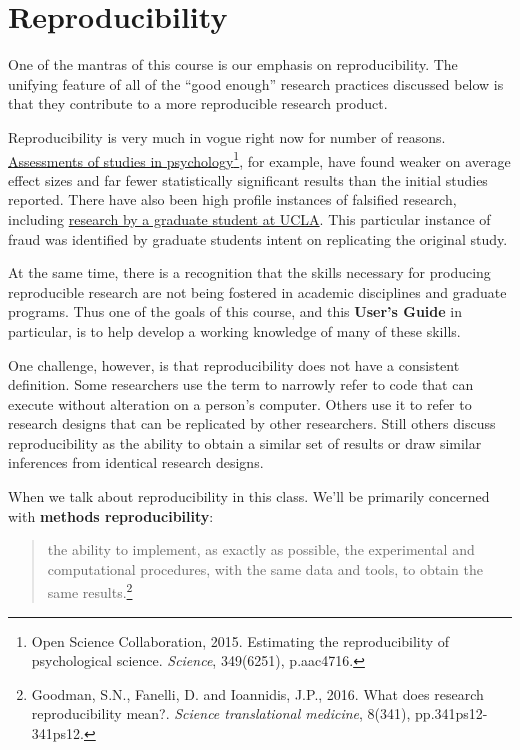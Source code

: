 \documentclass[]{book}
\let\rmarkdownfootnote\footnote%
\def\footnote{\protect\rmarkdownfootnote}
\begin{document}
\section{Reproducibility}\label{reproducibility}

One of the mantras of this course is our emphasis on reproducibility.
The unifying feature of all of the ``good enough'' research practices
discussed below is that they contribute to a more reproducible research
product.

Reproducibility is very much in vogue right now for number of reasons.
\href{http://science.sciencemag.org/content/349/6251/aac4716}{Assessments
of studies in psychology}\footnote{Open Science Collaboration, 2015.
  Estimating the reproducibility of psychological science.
  \emph{Science}, 349(6251), p.aac4716.}, for example, have found weaker
on average effect sizes and far fewer statistically significant results
than the initial studies reported. There have also been high profile
instances of falsified research, including
\href{http://nymag.com/scienceofus/2015/05/how-a-grad-student-uncovered-a-huge-fraud.html}{research
by a graduate student at UCLA}. This particular instance of fraud was
identified by graduate students intent on replicating the original
study.

At the same time, there is a recognition that the skills necessary for
producing reproducible research are not being fostered in academic
disciplines and graduate programs. Thus one of the goals of this course,
and this \textbf{User's Guide} in particular, is to help develop a
working knowledge of many of these skills.

One challenge, however, is that reproducibility does not have a
consistent definition. Some researchers use the term to narrowly refer
to code that can execute without alteration on a person's computer.
Others use it to refer to research designs that can be replicated by
other researchers. Still others discuss reproducibility as the ability
to obtain a similar set of results or draw similar inferences from
identical research designs.

When we talk about reproducibility in this class. We'll be primarily
concerned with \textbf{methods reproducibility}:

\begin{quote}
the ability to implement, as exactly as possible, the experimental and
computational procedures, with the same data and tools, to obtain the
same results.\footnote{Goodman, S.N., Fanelli, D. and Ioannidis, J.P.,
  2016. What does research reproducibility mean?. \emph{Science
  translational medicine}, 8(341), pp.341ps12-341ps12.}
\end{quote}
\end{document}
